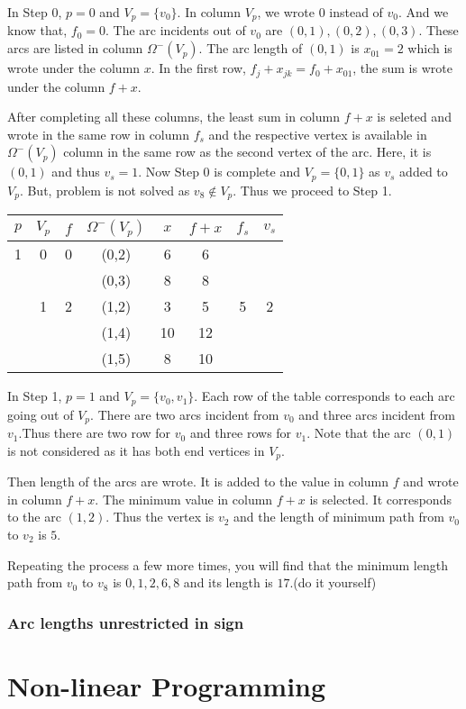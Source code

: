 \begin{example}
\begin{commentary}
	In Step 0, $p = 0$ and $V_p = \{ v_0 \}$. In column $V_p$, we wrote $0$ instead of $v_0$. And we know that, $f_0 = 0$. The arc incidents out of $v_0$ are $(0,1), (0,2), (0,3)$. These arcs are listed in column $\Omega^-(V_p)$. The arc length of $(0,1)$ is $x_{01} = 2$ which is wrote under the column $x$. In the first row, $f_j + x_{jk} = f_0 + x_{01}$, the sum is wrote under the column $f+x$.

	After completing all these columns, the least sum in column $f+x$ is seleted and wrote in the same row in column $f_s$ and the respective vertex is available in $\Omega^-(V_p)$ column in the same row as the second vertex of the arc. Here, it is $(0,1)$ and thus $v_s = 1$. Now Step 0 is complete and $V_p = \{ 0,1 \}$ as $v_s$ added to $V_p$. But, problem is not solved as $v_8 \notin V_p$. Thus we proceed to Step 1.
\end{commentary}

\begin{center}
\begin{tabular}{*{8}{c}}
	$p$ & $V_p$ & $f$ & $\Omega^-(V_p)$ & $x$ & $f+x$ & $f_s$ & $v_s$ \\ \hline
	1 & 0 & 0 & (0,2) & 6 & 6 & & \\
	& & & (0,3) & 8 & 8 & & \\
	& 1 & 2 & (1,2) & 3 & 5 & 5 & 2 \\
	& & & (1,4) & 10 & 12 & & \\
	& & & (1,5) & 8 & 10 & & \\ \hline
\end{tabular}
\end{center}

\begin{commentary}
	In Step 1, $p = 1$ and $V_p = \{v_0,v_1\}$. Each row of the table corresponds to each arc going out of $V_p$. There are two arcs incident from $v_0$ and three arcs incident from $v_1$.Thus there are two row for $v_0$ and three rows for $v_1$. Note that the arc $(0,1)$ is not considered as it has both end vertices in $V_p$.
	
	Then length of the arcs are wrote. It is added to the value in column $f$ and wrote in column $f+x$. The minimum value in column $f+x$ is selected. It corresponds to the arc $(1,2)$. Thus the vertex is $v_2$ and the length of minimum path from $v_0$ to $v_2$ is $5$.
\end{commentary}

Repeating the process a few more times, you will find that the minimum length path from $v_0$ to $v_8$ is $0,1,2,6,8$ and its length is $17$.(do it yourself)
\end{example}

\subsubsection{Arc lengths unrestricted in sign}
\pagebreak

\section{Non-linear Programming}

